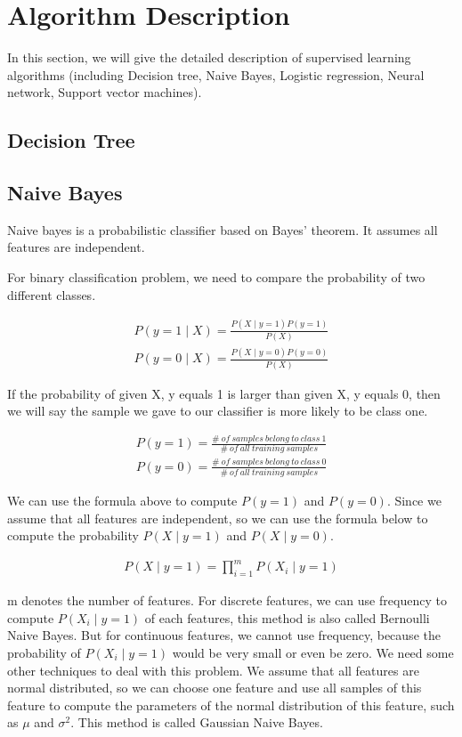 \documentclass[11pt]{article}
\begin{document}
\section{Algorithm Description}
In this section, we will give the detailed description of supervised learning algorithms (including Decision tree, Naive Bayes, Logistic regression, Neural network, Support vector machines).

\subsection{Decision Tree}

\subsection{Naive Bayes}

Naive bayes is a probabilistic classifier based on Bayes' theorem. It assumes all features are independent.

For binary classification problem, we need to compare the probability of two different classes.

\begin{gather}
P(y = 1\mid X) = \frac{P(X\mid y = 1)P(y = 1)}{P(X)} \\
P(y = 0\mid X) = \frac{P(X\mid y = 0)P(y = 0)}{P(X)}
\end{gather}

If the probability of given X, y equals 1 is larger than given X, y equals 0, then we will say the sample we gave to our classifier is more likely to be class one.

\begin{gather}
P(y = 1) = \frac{\# \ of\ samples\ belong\ to\ class\ 1}{\# \ of\ all\ training\ samples} \\
P(y = 0) = \frac{\# \ of\ samples\ belong\ to\ class\ 0}{\# \ of\ all\ training\ samples}
\end{gather}

We can use the formula above to compute $P(y = 1)$ and $P(y = 0)$.
Since we assume that all features are independent, so we can use the formula below to compute the probability $P(X\mid y = 1)$ and $P(X\mid y = 0)$.

\begin{gather}
P(X\mid y = 1) = \prod^m_{i=1}P(X_i\mid y = 1)
\end{gather}

m denotes the number of features.
For discrete features, we can use frequency to compute $P(X_i\mid y = 1)$ of each features, this method is also called Bernoulli Naive Bayes. But for continuous features, we cannot use frequency, because the probability of $P(X_i\mid y = 1)$ would be very small or even be zero. We need some other techniques to deal with this problem. We assume that all features are normal distributed, so we can choose one feature and use all samples of this feature to compute the parameters of the normal distribution of this feature, such as $\mu $ and $\sigma ^2$. This method is called Gaussian Naive Bayes.
\end{document}
